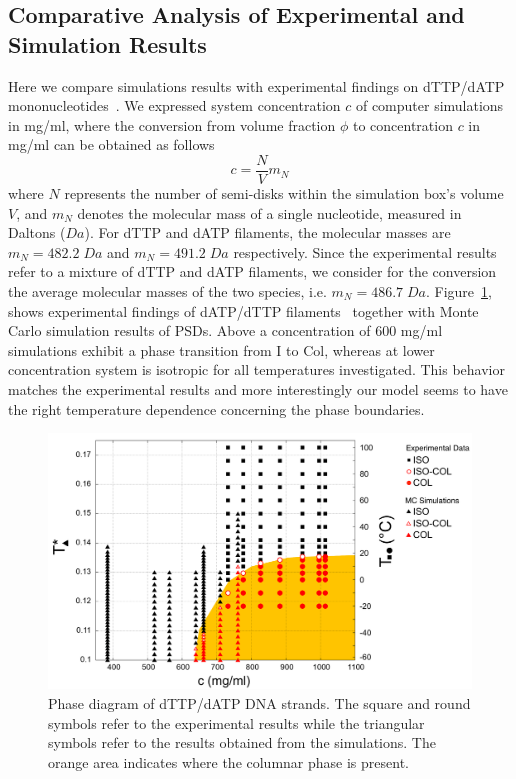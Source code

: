 \documentclass[aip,jcp, amsmath, amssymb, reprint]{revtex4-1}
\begin{document}
\subsection{Comparative Analysis of Experimental and Simulation Results}

Here we compare simulations results with experimental findings on dTTP/dATP mononucleotides~\cite{Smith}.
We expressed system concentration $c$ of computer simulations in mg/ml, where the conversion 
from volume fraction $\phi$ to concentration $c$ in mg/ml can be obtained as follows
\begin{equation}
	c=\frac{N}{V}m_N
	\label{conc}
\end{equation}
where $N$ represents the number of semi-disks within the simulation box's volume $V$, and $m_N$ denotes the molecular
mass of a single nucleotide, measured in Daltons ($Da$). For dTTP and dATP filaments, the molecular masses are
$m_N=482.2\; Da$ and $m_N=491.2\; Da$ respectively. Since the experimental results refer to a mixture of dTTP and dATP
filaments, we consider for the conversion the average molecular masses of the two species, i.e. $m_N=486.7\; Da$. 
Figure~\ref{fig:wide}, shows experimental  findings of dATP/dTTP filaments~\cite{Smith} together with Monte Carlo
simulation results of PSDs.  Above a concentration of 600 mg/ml simulations exhibit a phase transition from I to Col,
whereas at lower concentration system is isotropic for all temperatures investigated. This behavior matches the
experimental results and more interestingly our model seems to have the right temperature dependence concerning the
phase boundaries.

\begin{figure}[t!] \includegraphics[width=0.7\linewidth]{finaleeng.png} \caption{\label{fig:wide}Phase diagram of
    dTTP/dATP DNA strands. The square and round symbols refer to the experimental results while the triangular symbols
  refer to the results obtained from the simulations. The orange area indicates where the columnar phase is present.}
\end{figure}
\end{document}
